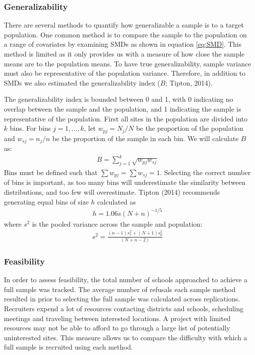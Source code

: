 \documentclass[man,floatsintext]{apa6}
\begin{document}
\hypertarget{generalizability}{%
\subsubsection{Generalizability}\label{generalizability}}

There are several methods to quantify how generalizable a sample is to a target population. One common method is to compare the sample to the population on a range of covariates by examining SMDs as shown in equation \eqref{eq:SMD}. This method is limited as it only provides us with a measure of how close the sample means are to the population means. To have true generalizability, sample variance must also be representative of the population variance. Therefore, in addition to SMDs we also estimated the generalizability index (\(B\); Tipton, 2014).

The generalizability index is bounded between 0 and 1, with 0 indicating no overlap between the sample and the population, and 1 indicating the sample is representative of the population. First all sites in the population are divided into \(k\) bins. For bins \(j = 1,...,k\), let \(w_{pj} = N_j/N\) be the proportion of the population and \(w_{sj} = n_j/n\) be the proportion of the sample in each bin. We will calculate \(B\) as:
\begin{align}
  B = \sum^k_{j=1}\sqrt{w_{pj}w_{sj}}
\end{align}
Bins must be defined such that \(\sum{w_{pj}} = \sum{w_{sj}} = 1\). Selecting the correct number of bins is important, as too many bins will underestimate the similarity between distributions, and too few will overestimate. Tipton (2014) recommends generating equal bins of size \(h\) calculated as
\begin{align}
  h = 1.06s(N+n)^{-1/5}
\end{align}
where \(s^2\) is the pooled variance across the sample and population:
\begin{align}
  s^2 = \frac{(n - 1)s^2_s + (N + 1)s^2_p}{(N + n - 2)}
\end{align}

\hypertarget{feasibility}{%
\subsubsection{Feasibility}\label{feasibility}}

In order to assess feasibility, the total number of schools approached to achieve a full sample was tracked. The average number of refusals each sample method resulted in prior to selecting the full sample was calculated across replications. Recruiters expend a lot of resources contacting districts and schools, scheduling meetings and traveling between interested locations. A project with limited resources may not be able to afford to go through a large list of potentially uninterested sites. This measure allows us to compare the difficulty with which a full sample is recruited using each method.
\end{document}
